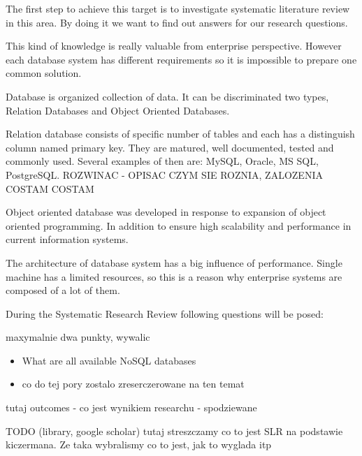 \documentclass[times, 10pt,twocolumn]{article}
\begin{document}
The first step to achieve this target is to investigate systematic literature review in this area.
By doing it we want to find out answers for our research questions.

This kind of knowledge is really valuable from enterprise perspective. However each database
system has different requirements so it is impossible to prepare one common solution.
 

Database is organized collection of data. It can be discriminated two types, 
Relation Databases and Object Oriented Databases.

Relation database consists of specific number of tables and each has a distinguish column named primary key. 
They are matured, well documented, tested and commonly used. Several examples of then are: MySQL, Oracle, MS SQL, PostgreSQL. 
ROZWINAC - OPISAC CZYM SIE ROZNIA, ZALOZENIA COSTAM COSTAM 

Object oriented database was developed in response to expansion of object oriented programming. In addition to ensure high scalability and  
performance in current information systems.

The architecture of database system has a big influence of performance. Single machine has a limited
resources, so this is a reason why enterprise systems  are composed of a lot of them.



During the Systematic Research Review following questions will be posed: 

maxymalnie dwa punkty, wywalic

\begin{itemize}
  \item What are all available NoSQL databases
  \item co do tej pory zostalo zreserczerowane na ten temat 
\end{itemize}

tutaj outcomes - co jest wynikiem researchu - spodziewane


TODO (library, google scholar)
tutaj streszczamy co to jest SLR na podstawie kiczermana. Ze taka wybralismy
co to jest, jak to wyglada itp

\end{document}
